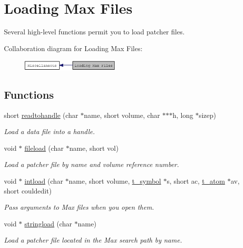 \hypertarget{group__loading__max__files}{
\section{Loading Max Files}
\label{group__loading__max__files}
}


Several high-\/level functions permit you to load patcher files.  


Collaboration diagram for Loading Max Files:\nopagebreak
\begin{figure}[H]
\begin{center}
\leavevmode
\includegraphics[width=142pt]{group__loading__max__files}
\end{center}
\end{figure}
\subsection*{Functions}
\begin{DoxyCompactItemize}
\item 
short \hyperlink{group__loading__max__files_ga7060a31b3b59a0ba1b08cd5f7b89704b}{readtohandle} (char $\ast$name, short volume, char $\ast$$\ast$$\ast$h, long $\ast$sizep)
\begin{DoxyCompactList}\small\item\em Load a data file into a handle. \item\end{DoxyCompactList}\item 
void $\ast$ \hyperlink{group__loading__max__files_ga1fb5c65c6c0ff9d2c92a7f95da9c7635}{fileload} (char $\ast$name, short vol)
\begin{DoxyCompactList}\small\item\em Load a patcher file by name and volume reference number. \item\end{DoxyCompactList}\item 
void $\ast$ \hyperlink{group__loading__max__files_gaf04b19ac11c4ce1d2641aa409cbd7128}{intload} (char $\ast$name, short volume, \hyperlink{structt__symbol}{t\_\-symbol} $\ast$s, short ac, \hyperlink{structt__atom}{t\_\-atom} $\ast$av, short couldedit)
\begin{DoxyCompactList}\small\item\em Pass arguments to Max files when you open them. \item\end{DoxyCompactList}\item 
void $\ast$ \hyperlink{group__loading__max__files_ga8797a7efcb5a716e8ee0aa8a588b4a69}{stringload} (char $\ast$name)
\begin{DoxyCompactList}\small\item\em Load a patcher file located in the Max search path by name. \item\end{DoxyCompactList}\end{DoxyCompactItemize}


